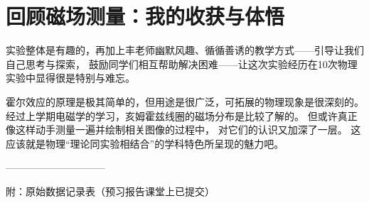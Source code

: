 \documentclass[11pt]{article}
\begin{document}





\section{回顾磁场测量：我的收获与体悟}

实验整体是有趣的，再加上丰老师幽默风趣、循循善诱的教学方式——引导让我们自己思考与探索，
鼓励同学们相互帮助解决困难——让这次实验经历在10次物理实验中显得很是特别与难忘。

霍尔效应的原理是极其简单的，但用途是很广泛，可拓展的物理现象是很深刻的。
经过上学期电磁学的学习，亥姆霍兹线圈的磁场分布是比较了解的。
但或许真正像这样动手测量一遍并绘制相关图像的过程中，
对它们的认识又加深了一层。
这应该就是物理“理论同实验相结合”的学科特色所呈现的魅力吧。











\bigskip
——————————

附：原始数据记录表（预习报告课堂上已提交）

\end{document}
